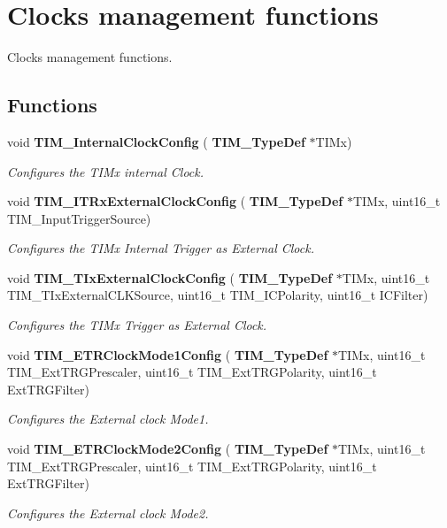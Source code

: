 \section{Clocks management functions}
\label{group__TIM__Group6}


Clocks management functions.  


\subsection*{Functions}
\begin{DoxyCompactItemize}
\item 
void \textbf{ T\+I\+M\+\_\+\+Internal\+Clock\+Config} (\textbf{ T\+I\+M\+\_\+\+Type\+Def} $\ast$T\+I\+Mx)
\begin{DoxyCompactList}\small\item\em Configures the T\+I\+Mx internal Clock. \end{DoxyCompactList}\item 
void \textbf{ T\+I\+M\+\_\+\+I\+T\+Rx\+External\+Clock\+Config} (\textbf{ T\+I\+M\+\_\+\+Type\+Def} $\ast$T\+I\+Mx, uint16\+\_\+t T\+I\+M\+\_\+\+Input\+Trigger\+Source)
\begin{DoxyCompactList}\small\item\em Configures the T\+I\+Mx Internal Trigger as External Clock. \end{DoxyCompactList}\item 
void \textbf{ T\+I\+M\+\_\+\+T\+Ix\+External\+Clock\+Config} (\textbf{ T\+I\+M\+\_\+\+Type\+Def} $\ast$T\+I\+Mx, uint16\+\_\+t T\+I\+M\+\_\+\+T\+Ix\+External\+C\+L\+K\+Source, uint16\+\_\+t T\+I\+M\+\_\+\+I\+C\+Polarity, uint16\+\_\+t I\+C\+Filter)
\begin{DoxyCompactList}\small\item\em Configures the T\+I\+Mx Trigger as External Clock. \end{DoxyCompactList}\item 
void \textbf{ T\+I\+M\+\_\+\+E\+T\+R\+Clock\+Mode1\+Config} (\textbf{ T\+I\+M\+\_\+\+Type\+Def} $\ast$T\+I\+Mx, uint16\+\_\+t T\+I\+M\+\_\+\+Ext\+T\+R\+G\+Prescaler, uint16\+\_\+t T\+I\+M\+\_\+\+Ext\+T\+R\+G\+Polarity, uint16\+\_\+t Ext\+T\+R\+G\+Filter)
\begin{DoxyCompactList}\small\item\em Configures the External clock Mode1. \end{DoxyCompactList}\item 
void \textbf{ T\+I\+M\+\_\+\+E\+T\+R\+Clock\+Mode2\+Config} (\textbf{ T\+I\+M\+\_\+\+Type\+Def} $\ast$T\+I\+Mx, uint16\+\_\+t T\+I\+M\+\_\+\+Ext\+T\+R\+G\+Prescaler, uint16\+\_\+t T\+I\+M\+\_\+\+Ext\+T\+R\+G\+Polarity, uint16\+\_\+t Ext\+T\+R\+G\+Filter)
\begin{DoxyCompactList}\small\item\em Configures the External clock Mode2. \end{DoxyCompactList}\end{DoxyCompactItemize}


